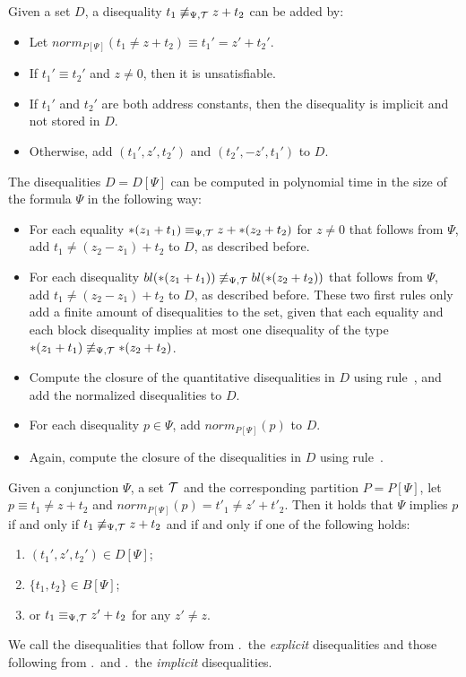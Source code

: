 Given a set $D$, a disequality $t_1 \not\equiv_{\Psi,\mathcal{T}} z + t_2$ can be added by:
\begin{itemize}
\item Let $norm_{P[\Psi]}(t_1 \neq z + t_2) \equiv t_1' = z' + t_2'$.
\item If $t_1' \equiv t_2'$ and $z \neq 0$, then it is unsatisfiable.
\item If $t_1'$ and $t_2'$ are both address constants, then the disequality is implicit and not stored in $D$.
\item Otherwise, add $(t_1', z', t_2')$ and $(t_2', -z', t_1')$ to $D$.
\end{itemize}

The disequalities $D = D[\Psi]$ can be computed in polynomial time in the size of the formula $\Psi$ in the following way:

\begin{itemize}
    \item\label{item:diseq-equalities} For each equality $*(z_1 + t_1) \equiv_{\Psi,\mathcal{T}} z + *(z_2 + t_2)$ for $z \neq 0$
          that follows from $\Psi$,
          add $t_1 \neq (z_2 - z_1) + t_2$ to $D$, as described before.
    \item\label{item:diseq-bldiseq} For each disequality $bl(*(z_1 + t_1)) \not\equiv_{\Psi,\mathcal{T}} bl(*(z_2 + t_2))$ that follows from $\Psi$, add $t_1 \neq (z_2 - z_1) + t_2$ to $D$, as described before.
          These two first rules only add a finite amount of disequalities to the set, given that each equality and each block disequality implies at most one disequality of the type $*(z_1 + t_1) \not\equiv_{\Psi,\mathcal{T}} *(z_2 + t_2)$.
    \item Compute the closure of the quantitative disequalities in $D$ using rule~, and add the normalized disequalities to $D$.
    \item For each disequality $p \in \Psi$, add $norm_{P[\Psi]}(p)$ to $D$.
    \item Again, compute the closure of the disequalities in $D$ using rule~.
\end{itemize}

Given a conjunction $\Psi$, a set $\mathcal{T}$ and the corresponding partition $P = P[\Psi]$, let $p \equiv t_1 \neq z + t_2$ and $norm_{P[\Psi]}(p) = t'_1 \neq z' + t'_2$.
Then
it holds that $\Psi$ implies $p$ if and only if $t_1 \not\equiv_{\Psi,\mathcal{T}} z + t_2$ and if and only if one of the following holds:

\begin{enumerate}
    \item\label{item:diseqs} $(t_1',z', t_2') \in D[\Psi]$;
    \item\label{item:bl-diseqs} $\{t_1,t_2\} \in B[\Psi]$;
    \item\label{item:eqs} or $t_1 \equiv_{\Psi,\mathcal{T}} z' + t_2$ for any $z' \neq z$.
\end{enumerate}
We call the disequalities that follow from .\ the \emph{explicit} disequalities and those following from .\ and .\ the \emph{implicit} disequalities.

